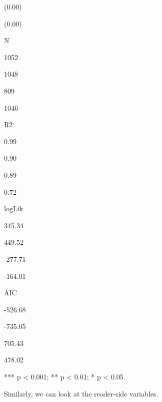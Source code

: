 \documentclass[
]{book}
\begin{document}
(0.00)~~~

(0.00)~~~

N

1052~~~~~~~

1048~~~~~~~

809~~~~~~~

1046~~~~~~~

R2

0.99~~~~

0.90~~~~

0.89~~~~

0.72~~~~

logLik

345.34~~~~

449.52~~~~

-277.71~~~~

-164.01~~~~

AIC

-526.68~~~~

-735.05~~~~

705.43~~~~

478.02~~~~

*** p \textless{} 0.001; ** p \textless{} 0.01; * p \textless{} 0.05.

Similarly, we can look at the reader-side variables.
\end{document}
